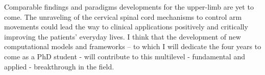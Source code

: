 \documentclass[a4paper,oneside,12pt]{article}
\begin{document}
Comparable findings and paradigms developments for the upper-limb are yet to come. The unraveling of the cervical spinal cord mechanisms to control arm movements could lead the way to clinical applications positively and critically improving the patients’ everyday lives.
I think that the development of new computational models and frameworks – to which I will dedicate the four years to come as a PhD student - will contribute to this multilevel - fundamental and applied - breakthrough in the field. \\
\end{document}
